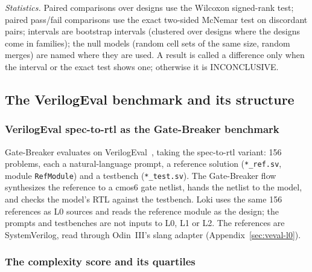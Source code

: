 \documentclass[conference]{IEEEtran}
\newcommand{\code}[1]{\texttt{#1}}
\begin{document}
\emph{Statistics.} Paired comparisons over designs use the Wilcoxon signed-rank test; paired
pass/fail comparisons use the exact two-sided McNemar test on discordant pairs; intervals are
bootstrap intervals (clustered over designs where the designs come in families); the null models
(random cell sets of the same size, random merges) are named where they are used. A result is
called a difference only when the interval or the exact test shows one; otherwise it is
INCONCLUSIVE.

\subsection{The VerilogEval benchmark and its structure}
\label{sec:bench}

\subsubsection{VerilogEval spec-to-rtl as the Gate-Breaker benchmark}
\label{sec:veval-bench}

Gate-Breaker evaluates on VerilogEval~\cite{liu2023verilogeval}, taking the spec-to-rtl
variant: 156 problems, each a natural-language prompt, a reference solution
(\code{*\_ref.sv}, module \code{RefModule}) and a testbench (\code{*\_test.sv}). The
Gate-Breaker flow synthesizes the reference to a cmos6 gate netlist, hands the netlist to the
model, and checks the model's RTL against the testbench. Loki uses the same 156 references as
L0 sources and reads the reference module as the design; the prompts and testbenches are not
inputs to L0, L1 or L2. The references are SystemVerilog, read through Odin~III's slang
adapter (Appendix~\ref{sec:veval-l0}).

\subsubsection{The complexity score and its quartiles}
\label{sec:complexity}
\end{document}
